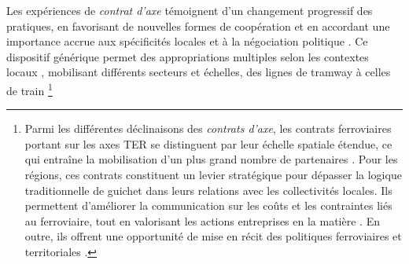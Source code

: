 \begin{refsegment}
Les expériences de \textsl{contrat d’axe} témoignent d’un changement progressif  des pratiques, en favorisant de nouvelles formes de coopération et en accordant une importance accrue aux spécificités locales et à la négociation politique \textcolor{blue}{\autocite[96]{maulat_contractualiser_2015}}. Ce dispositif générique permet des appropriations multiples selon les contextes locaux \textcolor{blue}{\autocite[457, 468]{maulat_coordonner_2014}}, mobilisant différents secteurs et échelles, des lignes de tramway à celles de train \footnote{
    Parmi les différentes déclinaisons des \textsl{contrats d’axe}, les contrats ferroviaires portant sur les axes \acrshort{TER} se distinguent par leur échelle spatiale étendue, ce qui entraîne la mobilisation d’un plus grand nombre de partenaires \textcolor{blue}{\autocite[51]{cerema_articuler_2015}}. Pour les régions, ces contrats constituent un levier stratégique pour dépasser la logique traditionnelle de guichet dans leurs relations avec les collectivités locales. Ils permettent d’améliorer la communication sur les coûts et les contraintes liés au ferroviaire, tout en valorisant les actions entreprises en la matière \textcolor{blue}{\autocite[53]{cerema_articuler_2015}}. En outre, ils offrent une opportunité de mise en récit des politiques ferroviaires et territoriales \textcolor{blue}{\autocite{fandio_contrat_2023}}.
}
\end{refsegment}
